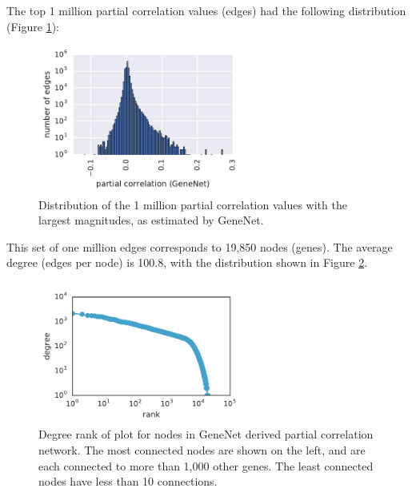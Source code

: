 The top 1 million partial correlation values (edges) had the following distribution (Figure \ref{fig:pcor_hist}):
\begin{figure}[H]
\centering
    \includegraphics[width=0.6\textwidth]{./tex/chapter3/figures/pcor_hist--1e+06_edges.pdf}
    \begin{singlespace}
    \caption[Distribution of the 1 million partial correlation values with the largest magnitudes]{
        Distribution of the 1 million partial correlation values with the largest magnitudes, as estimated by GeneNet.
        }
    \label{fig:pcor_hist}
    \end{singlespace}
\end{figure}
This set of one million edges corresponds to 19,850 nodes (genes).
The average degree (edges per node) is 100.8, with the distribution shown in Figure \ref{fig:degree_rank}.
\begin{figure}[H]
\centering
    \includegraphics[width=0.6\textwidth]{./tex/chapter3/figures/170406_degree_rank_plot--GeneNet_1e+06_edges--title_deleted_inkscape.pdf}
    \begin{singlespace}
    \caption[Degree rank of plot for nodes in GeneNet derived partial correlation network]{
    	Degree rank of plot for nodes in GeneNet derived partial correlation network.
	The most connected nodes are shown on the left, and are each connected to more than 1,000 other genes.
	The least connected nodes have less than 10 connections.
        }
    \label{fig:degree_rank}
    \end{singlespace}
\end{figure}

